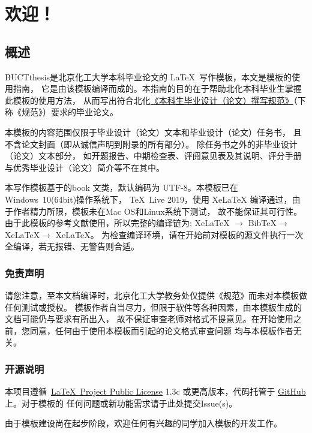 \chapter{欢迎！}
\section{概述}
BUCTthesis是北京化工大学本科毕业论文的 \LaTeX\ 写作模板，本文是模板的使用指南，
它是由该模板编译而成的。本指南的目的在于帮助北化本科毕业生掌握此模板的使用方法，
从而写出符合北化\href{https://jiaowuchu.buct.edu.cn/2018/1009/c515a22046/page.htm}%
{《本科生毕业设计（论文）撰写规范》}（下称《规范》）要求的毕业论文。

本模板的内容范围仅限于毕业设计（论文）文本和毕业设计（论文）任务书，
且不含论文封面（即从诚信声明到附录的所有部分）。
除任务书之外的非毕业设计（论文）文本部分，
如开题报告、中期检查表、评阅意见表及其说明、评分手册与优秀毕业设计（论文）简介等不在其中。

本写作模板基于\CTeX{}的book 文类，默认编码为 UTF-8。本模板已在Windows\ 10(64bit)操作系统下，
\TeX\ Live 2019，使用 XeLaTeX 编译通过，由于作者精力所限，模板未在Mac OS和Linux系统下测试，
故不能保证其可行性。由于此模板的参考文献使用\BibTeX{}，所以完整的编译链为:
XeLaTeX $\to$ BibTeX{}$\to$ XeLaTeX{}$\to$ XeLaTeX{}。
为检查编译环境，请在开始前对模板的源文件执行一次全编译，若无报错、无警告则合适。

\subsection{免责声明}
请您注意，至本文档编译时，北京化工大学教务处仅提供《规范》而未对本模板做任何测试或授权。
模板作者自当尽力，但限于软件等各种因素，由本模板生成的文档可能仍与要求有所出入，
故不保证审查老师对格式不提意见。在开始使用之前，您同意，任何由于使用本模板而引起的论文格式审查问题
均与本模板作者无关。

\subsection{开源说明}
本项目遵循~\href{https://www.latex-project.org/lppl.txt}{\LaTeX\ Project Public License} 1.3c
或更高版本，代码托管于 \href{https://github.com/Miracle0565/BUCTthesis}{GitHub} 上。对于模板的
任何问题或新功能需求请于此处提交Issue(s)。

由于模板建设尚在起步阶段，欢迎任何有兴趣的同学加入模板的开发工作。

